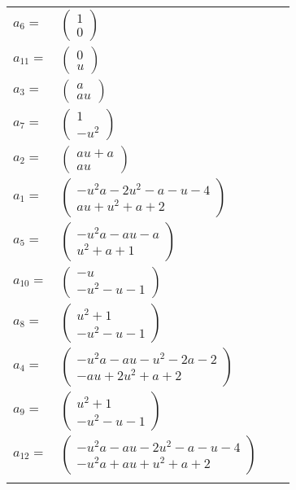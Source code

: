 \documentclass[1p]{elsarticle_modified}
\theoremstyle{definition}
\begin{document}
\begin{tabular}{m{7pt} m{180pt} m{7pt} m{180pt} }
\flushright $a_{6}=$&$\begin{pmatrix}1\\0\end{pmatrix}$ \\
\flushright $a_{11}=$&$\begin{pmatrix}0\\u\end{pmatrix}$ \\
\flushright $a_{3}=$&$\begin{pmatrix}a\\a u\end{pmatrix}$ \\
\flushright $a_{7}=$&$\begin{pmatrix}1\\- u^2\end{pmatrix}$ \\
\flushright $a_{2}=$&$\begin{pmatrix}a u+a\\a u\end{pmatrix}$ \\
\flushright $a_{1}=$&$\begin{pmatrix}- u^2 a-2 u^2- a- u-4\\a u+u^2+a+2\end{pmatrix}$ \\
\flushright $a_{5}=$&$\begin{pmatrix}- u^2 a- a u- a\\u^2+a+1\end{pmatrix}$ \\
\flushright $a_{10}=$&$\begin{pmatrix}- u\\- u^2- u-1\end{pmatrix}$ \\
\flushright $a_{8}=$&$\begin{pmatrix}u^2+1\\- u^2- u-1\end{pmatrix}$ \\
\flushright $a_{4}=$&$\begin{pmatrix}- u^2 a- a u- u^2-2 a-2\\- a u+2 u^2+a+2\end{pmatrix}$ \\
\flushright $a_{9}=$&$\begin{pmatrix}u^2+1\\- u^2- u-1\end{pmatrix}$ \\
\flushright $a_{12}=$&$\begin{pmatrix}- u^2 a- a u-2 u^2- a- u-4\\- u^2 a+a u+u^2+a+2\end{pmatrix}$\\&\end{tabular}
\end{document}
